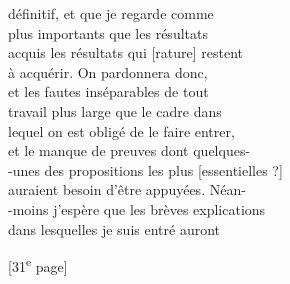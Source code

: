 \documentclass{book}
\begin{document}
{\begin{paracol}{2}
définitif, et que je regarde comme\\
plus importants que les résultats\\
acquis les résultats qui [rature] restent\\
à acquérir. On pardonnera donc,\\
et les fautes inséparables de tout\\
travail plus large que le cadre dans\\
lequel on est obligé de le faire entrer,\\
et le manque de preuves dont quelques-\\
-unes des propositions les plus [essentielles ?]\\
auraient besoin d’être appuyées. Néan-\\
-moins j’espère que les brèves explications\\
dans lesquelles je suis entré auront
\end{paracol}

{\footnotesize\begin{center} {[31\textsuperscript{e} page]}\end{center}}

}
\end{document}
